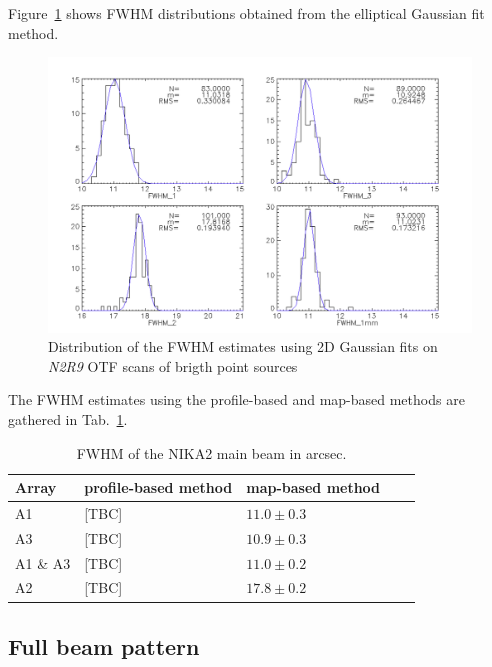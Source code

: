 Figure~\ref{fig:fwhm_map} shows FWHM distributions obtained from the elliptical Gaussian fit method.


\begin{figure}
\begin{center}
  \includegraphics[clip, angle=0, scale=0.4]{Figures/plot_histo_fwhm_run9_calibII_all_nocut.pdf}
\caption{Distribution of the FWHM estimates using 2D Gaussian fits on \emph{N2R9} OTF scans of brigth point sources}
\label{fig:fwhm_map}
\end{center}
\end{figure}


The FWHM estimates using the profile-based and map-based methods are gathered in Tab.~\ref{tab:fwhm}. 
\begin{table}
  \caption[]{FWHM of the NIKA2 main beam in arcsec.}
  \centering
  \begin{tabular}{|l|l|l|l|l|}
    \hline
    Array & profile-based method & map-based method \\
    \hline
    A1       & [TBC] & $11.0 \pm 0.3$ \\
    A3       & [TBC] & $10.9 \pm 0.3$ \\
    A1 \& A3 & [TBC] & $11.0 \pm 0.2$ \\
    A2       & [TBC] & $17.8 \pm 0.2$ \\
    \hline
  \end{tabular}
  \label{tab:fwhm}
\end{table}



\subsection{Full beam pattern}

